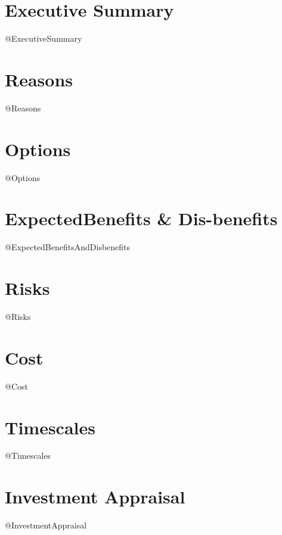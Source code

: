 \documentclass{report}
\begin{document}
\date{\today}
\author{@Author}

\maketitle

\tableofcontents

\newpage


\section{Executive Summary}
@ExecutiveSummary

\section{Reasons}
@Reasons

\section{Options}
@Options

\section{ExpectedBenefits \& Dis-benefits }
@ExpectedBenefitsAndDisbenefits

\section{Risks}
@Risks

\section{Cost}
@Cost

\section{Timescales}
@Timescales

\section{Investment Appraisal}
@InvestmentAppraisal
\end{document}
